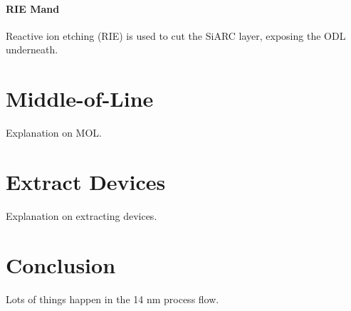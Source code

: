 \documentclass[conference]{IEEEtran}
\begin{document}
\paragraph{RIE Mand} Reactive ion etching (RIE) \cite{1481759} is used to cut
the SiARC layer, exposing the ODL underneath.

\section{Middle-of-Line}
Explanation on MOL.

\section{Extract Devices}
Explanation on extracting devices.

\section{Conclusion}
Lots of things happen in the 14 nm process flow.

\clearpage


\end{document}
